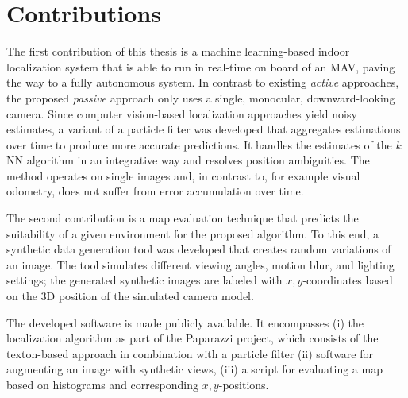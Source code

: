 \section{Contributions}
\label{sec:contributions}

The first contribution of this thesis is a machine learning-based
indoor localization system that is able to run in real-time on board
of an MAV, paving the way to a fully autonomous system. In contrast to
existing \emph{active} approaches, the proposed \emph{passive}
approach only uses a single, monocular, downward-looking camera. Since
computer vision-based localization approaches yield noisy estimates, a
variant of a particle filter was developed that aggregates estimations
over time to produce more accurate predictions. It handles the
estimates of the $k$NN algorithm in an integrative way and resolves
position ambiguities. The method operates on single images and, in
contrast to, for example visual odometry, does not suffer from error
accumulation over time.

The second contribution is a map evaluation technique that predicts
the suitability of a given environment for the proposed algorithm. To
this end, a synthetic data generation tool was developed that creates
random variations of an image. The tool simulates different viewing
angles, motion blur, and lighting settings; the generated synthetic
images are labeled with $x,y$-coordinates based on the 3D position of
the simulated camera model.

The developed software is made publicly available. It encompasses (i)
the localization algorithm as part of the Paparazzi project, which
consists of the texton-based approach in combination with a particle
filter (ii) software for augmenting an image with synthetic views,
(iii) a script for evaluating a map based on histograms and
corresponding $x,y$-positions.

